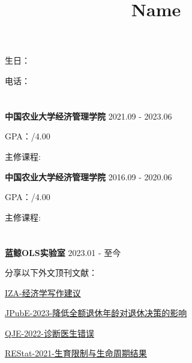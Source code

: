 \documentclass[UTF8,11pt]{ctexart}
\title{\vspace{-3em}Name\vspace{-3em}} %
\author{}
\date{}
\begin{document}

\maketitle


\section{\underline{} } 


\hspace{2em}生日：   

电话：  


\section{\underline{}}

\hspace{2em}\textbf{中国农业大学经济管理学院}  \hfill 2021.09 - 2023.06 

GPA：/4.00 

主修课程: 

\textbf{中国农业大学经济管理学院}  \hfill 2016.09 - 2020.06 

GPA：/4.00 

主修课程: 

\section{\underline{}}

\hspace{2em}\textbf{蓝鲸OLS实验室}  \tab{}  \hfill 2023.01 - 至今
 
 分享以下外文顶刊文献：

\href{https://mp.weixin.qq.com/s/3aoLsKh5J0J7huu1WbtVIg}{IZA-经济学写作建议}

\href{https://mp.weixin.qq.com/s/dz8usldAcGp7qXN-Kmf5LQ}{JPubE-2023-降低全额退休年龄对退休决策的影响}

\href{https://mp.weixin.qq.com/s/n0ddY4ehLmLXIS721hpWDw}{QJE-2022-诊断医生错误}

\href{https://mp.weixin.qq.com/s/ujISRry78_zRRUyTqoCphw}{REStat-2021-生育限制与生命周期结果}
\end{document}
